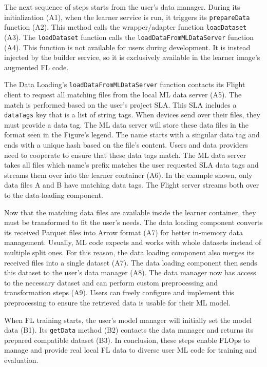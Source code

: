 The next sequence of steps starts from the user's data manager.
During its initialization (A1), when the learner service is run, it triggers its \texttt{prepareData} function (A2).
This method calls the wrapper/adapter function \texttt{loadDataset} (A3).
The \texttt{loadDataset} function calls the \texttt{loadDataFromMLDataServer} function (A4).
This function is not available for users during development.
It is instead injected by the builder service, so it is exclusively available in the learner image's augmented FL code.

The Data Loading's \texttt{loadDataFromMLDataServer} function contacts its Flight client to request all matching files from the local ML data server (A5).
The match is performed based on the user's project SLA.
This SLA includes a \texttt{dataTags} key that is a list of string tags.
When devices send over their files, they must provide a data tag.
The ML data server will store these data files in the format seen in the Figure's legend.
The name starts with a singular data tag and ends with a unique hash based on the file's content.
Users and data providers need to cooperate to ensure that these data tags match.
The ML data server takes all files which name's prefix matches the user requested SLA data tags and streams them over into the learner container (A6).
In the example shown, only data files A and B have matching data tags.
The Flight server streams both over to the data-loading component.

Now that the matching data files are available inside the learner container, they must be transformed to fit the user's needs.
The data loading component converts its received Parquet files into Arrow format (A7) for better in-memory data management.
Usually, ML code expects and works with whole datasets instead of multiple split ones.
For this reason, the data loading component also merges its received files into a single dataset (A7).
The data loading component then sends this dataset to the user's data manager (A8).
The data manager now has access to the necessary dataset and can perform custom preprocessing and transformation steps (A9).
Users can freely configure and implement this preprocessing to ensure the retrieved data is usable for their ML model.

When FL training starts, the user's model manager will initially set the model data (B1).
Its \texttt{getData} method (B2) contacts the data manager and returns its prepared compatible dataset (B3).
In conclusion, these steps enable FLOps to manage and provide real local FL data to diverse user ML code for training and evaluation.